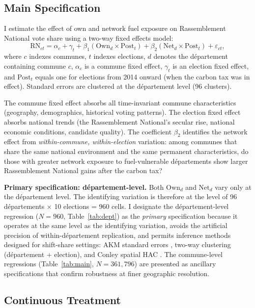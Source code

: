 \documentclass[12pt]{article}
\newcommand{\rn}{Rassemblement National}
\newcommand{\dept}{d\'{e}partement}
\newcommand{\depts}{d\'{e}partements}
\begin{document}
\subsection{Main Specification}

I estimate the effect of own and network fuel exposure on \rn{} vote share using a two-way fixed effects model:
\begin{equation}
\text{RN}_{ct} = \alpha_c + \gamma_t + \beta_1 (\text{Own}_d \times \text{Post}_t) + \beta_2 (\text{Net}_d \times \text{Post}_t) + \varepsilon_{ct},
\label{eq:main}
\end{equation}
where $c$ indexes communes, $t$ indexes elections, $d$ denotes the \dept{} containing commune $c$, $\alpha_c$ is a commune fixed effect, $\gamma_t$ is an election fixed effect, and $\text{Post}_t$ equals one for elections from 2014 onward (when the carbon tax was in effect). Standard errors are clustered at the \dept{} level (96 clusters).

The commune fixed effect absorbs all time-invariant commune characteristics (geography, demographics, historical voting patterns). The election fixed effect absorbs national trends (the \rn{}'s secular rise, national economic conditions, candidate quality). The coefficient $\beta_2$ identifies the network effect from \emph{within-commune, within-election} variation: among communes that share the same national environment and the same permanent characteristics, do those with greater network exposure to fuel-vulnerable \depts{} show larger \rn{} gains after the carbon tax?

\textbf{Primary specification: \dept{}-level.} Both $\text{Own}_d$ and $\text{Net}_d$ vary only at the \dept{} level. The identifying variation is therefore at the level of 96 \depts{} $\times$ 10 elections = 960 cells. I designate the \dept{}-level regression ($N = 960$, Table~\ref{tab:dept}) as the \emph{primary} specification because it operates at the same level as the identifying variation, avoids the artificial precision of within-\dept{} replication, and permits inference methods designed for shift-share settings: AKM standard errors \citep{adao2019shift}, two-way clustering (\dept{} + election), and Conley spatial HAC \citep{conley1999gmm}. The commune-level regressions (Table~\ref{tab:main}, $N = 361{,}796$) are presented as ancillary specifications that confirm robustness at finer geographic resolution.

\subsection{Continuous Treatment}
\end{document}
